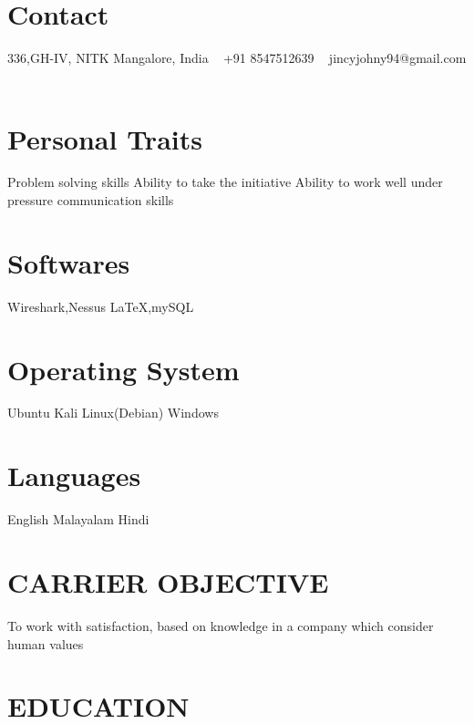 \documentclass[]{cv-style}          %
\begin{document}
\lastupdated


\begin{aside}
%
\section{Contact}
336,GH-IV, NITK
 Mangalore, India 
~
+91 8547512639
~
jincyjohny94@gmail.com
~
%
\section{Personal Traits}
 Problem solving skills
Ability to take the initiative
     Ability to work well under pressure
     communication skills
     ~
%
\section{Softwares}
Wireshark,Nessus
\LaTeX{},mySQL
%
\section{Operating
   System}
   Ubuntu
    Kali Linux(Debian)
Windows
%
\section{Languages}
 English
 Malayalam
 Hindi
%
\end{aside}

\section{CARRIER OBJECTIVE}
To work with satisfaction, based on knowledge in a company which consider human values
 \section{EDUCATION}
\end{document}

